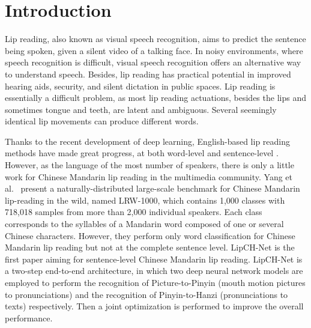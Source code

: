 \documentclass[sigconf]{acmart}
\begin{document}




\maketitle

\section{Introduction}\label{sec:introduction}
Lip reading, also known as visual speech recognition, aims to predict the sentence being spoken, given a silent video of a talking face. In noisy environments, where speech recognition is difficult, visual speech recognition offers an alternative way to understand speech. Besides, lip reading has practical potential in improved hearing aids, security, and silent dictation in public spaces. Lip reading is essentially a difficult problem, as most lip reading actuations, besides the lips and sometimes tongue and teeth, are latent and ambiguous. Several seemingly identical lip movements can produce different words.

Thanks to the recent development of deep learning, English-based lip reading methods have made great progress, at both word-level \cite{petridis2016deep, chung2016lip} and  sentence-level
\cite{assael2016lipnet, chung2017lipWild}. However, as the language of the most number of speakers, there is only a little work for Chinese Mandarin lip reading in the multimedia community. Yang et al.~\cite{yang2018lrw} present a naturally-distributed large-scale benchmark for Chinese Mandarin lip-reading in the wild, named LRW-1000, which contains 1,000 classes with 718,018 samples from more than 2,000 individual speakers. Each class corresponds to the syllables of a Mandarin word composed of one or several Chinese characters. However, they perform only word classification for Chinese Mandarin lip reading but not at the complete sentence level. LipCH-Net \cite{zhang2019understanding} is the first paper aiming for sentence-level Chinese Mandarin lip reading. LipCH-Net is a two-step end-to-end architecture, in which two deep neural network models are employed to perform the recognition of Picture-to-Pinyin (mouth motion pictures to pronunciations) and the recognition of Pinyin-to-Hanzi (pronunciations to texts) respectively. Then a joint optimization is performed to improve the overall performance.
\end{document}
